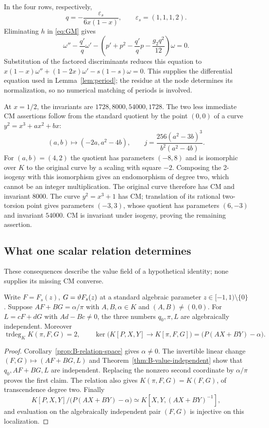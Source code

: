In the four rows, respectively,
\[
 q=-\frac{\varepsilon_s}{6x(1-x)},\qquad
 \varepsilon_s=(1,1,1,2).
\]
Eliminating $h$ in \eqref{eq:GM} gives
\[
 \omega''-\frac{q'}q\omega'
 -\left(p'+p^2-\frac{q'}q p-\frac{g_2q^2}{12}\right)\omega=0.
\]
Substitution of the factored discriminants reduces this equation to
$x(1-x)\omega''+(1-2x)\omega'-s(1-s)\omega=0$.
This supplies the differential equation used in
Lemma~\ref{lem:period}; the residue at the node determines its
normalization, so no numerical matching of periods is involved.

At $x=1/2$, the invariants are $1728,8000,54000,1728$. The two
less immediate CM assertions follow from the standard quotient by
the point $(0,0)$ of a curve $y^2=x^3+ax^2+bx$:
\[
 (a,b)\longmapsto(-2a,a^2-4b),\qquad
 j=\frac{256(a^2-3b)^3}{b^2(a^2-4b)}.
\]
For $(a,b)=(4,2)$ the quotient has parameters $(-8,8)$ and is
isomorphic over $K$ to the original curve by a scaling with square
$-2$. Composing the 2-isogeny with this isomorphism gives an
endomorphism of degree two, which cannot be an integer
multiplication. The original curve therefore has CM and invariant
$8000$. The curve $y^2=x^3+1$ has CM; translation of its rational
two-torsion point gives parameters $(-3,3)$, whose quotient has
parameters $(6,-3)$ and invariant $54000$. CM is invariant under
isogeny, proving the remaining assertion.

\subsection{What one scalar relation determines}
These consequences describe the value field of a hypothetical
identity; none supplies its missing CM converse.

\begin{proposition}\label{prop:B-value-field}
Write $F=F_s(z)$, $G=\vartheta F_s(z)$ at a standard algebraic
parameter $z\in[-1,1)\setminus\{0\}$. Suppose
$AF+BG=\alpha/\pi$ with $A,B,\alpha\in K$ and
$(A,B)\ne(0,0)$. For $L=cF+dG$ with $Ad-Bc\ne0$, the three
numbers $q_0,\pi,L$ are algebraically independent. Moreover
\[
 \operatorname{trdeg}_K K(\pi,F,G)=2,\qquad
 \ker\bigl(K[P,X,Y]\to K[\pi,F,G]\bigr)
       =\bigl(P(AX+BY)-\alpha\bigr).
\]
\end{proposition}
\begin{proof}
Corollary~\ref{prop:B-relation-space} gives $\alpha\ne0$.
The invertible linear change $(F,G)\mapsto(AF+BG,L)$ and
Theorem~\ref{thm:B-value-independent} show that $q_0,AF+BG,L$
are independent. Replacing the nonzero second coordinate by
$\alpha/\pi$ proves the first claim. The relation also gives
$K(\pi,F,G)=K(F,G)$, of transcendence degree two. Finally
\[
 K[P,X,Y]/\bigl(P(AX+BY)-\alpha\bigr)
       \simeq K[X,Y,(AX+BY)^{-1}],
\]
and evaluation on the algebraically independent pair $(F,G)$ is
injective on this localization.
\end{proof}


